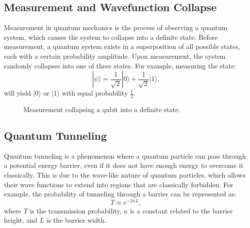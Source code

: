 \documentclass[12pt,a4paper]{report}
\begin{document}
\subsection{Measurement and Wavefunction Collapse}
Measurement in quantum mechanics is the process of observing a quantum system, which causes the system to collapse into a definite state. Before measurement, a quantum system exists in a superposition of all possible states, each with a certain probability amplitude. Upon measurement, the system randomly collapses into one of these states. For example, measuring the state:
\[
|\psi\rangle = \frac{1}{\sqrt{2}} |0\rangle + \frac{1}{\sqrt{2}} |1\rangle,
\]
will yield \( |0\rangle \) or \( |1\rangle \) with equal probability \( \frac{1}{2} \).

\begin{figure}[H]
    \centering
    \caption{Measurement collapsing a qubit into a definite state.}
\end{figure}

\subsection{Quantum Tunneling} 
Quantum tunneling is a phenomenon where a quantum particle can pass through a potential energy barrier, even if it does not have enough energy to overcome it classically. This is due to the wave-like nature of quantum particles, which allows their wave functions to extend into regions that are classically forbidden. For example, the probability of tunneling through a barrier can be represented as:
\[
T \approx e^{-2\kappa L},
\]
where \( T \) is the transmission probability, \( \kappa \) is a constant related to the barrier height, and \( L \) is the barrier width.
\end{document}
